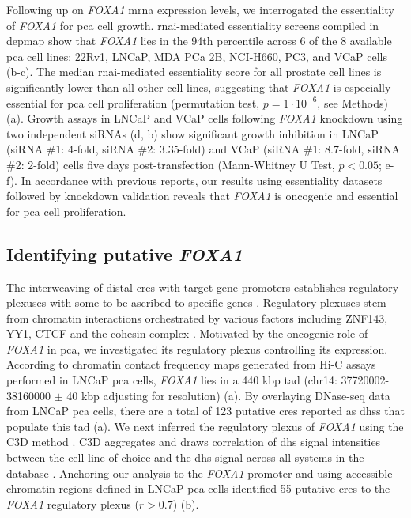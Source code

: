 Following up on \emph{FOXA1} \gls{mrna} expression levels, we interrogated the essentiality of \emph{FOXA1} for \gls{pca} cell growth.
\gls{rnai}-mediated essentiality screens compiled in \gls{depmap} show that \emph{FOXA1} lies in the 94th percentile across 6 of the 8 available \gls{pca} cell lines: 22Rv1, LNCaP, MDA PCa 2B, NCI-H660, PC3, and VCaP cells (b-c).
The median \gls{rnai}-mediated essentiality score for all prostate cell lines is significantly lower than all other cell lines, suggesting that \emph{FOXA1} is especially essential for \gls{pca} cell proliferation (permutation test, $p = 1 \cdot 10^{-6}$, see Methods) (a).
Growth assays in LNCaP and VCaP cells following \emph{FOXA1} knockdown using two independent siRNAs (d, b) show significant growth inhibition in LNCaP (siRNA \#1: 4-fold, siRNA \#2: 3.35-fold) and VCaP (siRNA \#1: 8.7-fold, siRNA \#2: 2-fold) cells five days post-transfection (Mann-Whitney U Test, $p<0.05$; e-f).
In accordance with previous reports, our results using essentiality datasets followed by knockdown validation reveals that \emph{FOXA1} is oncogenic and essential for \gls{pca} cell proliferation.

\subsection{Identifying putative \emph{FOXA1} }

The interweaving of distal \glspl{cre} with target gene promoters establishes regulatory plexuses with some to be ascribed to specific genes \cite{sallariConvergenceDispersedRegulatory2016,baileyNoncodingSomaticInherited2016}.
Regulatory plexuses stem from chromatin interactions orchestrated by various factors including ZNF143, YY1, CTCF and the cohesin complex \cite{phillipsCTCFMasterWeaver2009,weintraubYY1StructuralRegulator2017,baileyZNF143ProvidesSequence2015}.
Motivated by the oncogenic role of \emph{FOXA1} in \gls{pca}, we investigated its regulatory plexus controlling its expression.
According to chromatin contact frequency maps generated from Hi-C assays performed in LNCaP \gls{pca} cells, \emph{FOXA1} lies in a 440 \gls{kbp} \gls{tad} (chr14: 37720002-38160000 $\pm$ 40 \gls{kbp} adjusting for resolution) (a).
By overlaying DNase-seq data from LNCaP \gls{pca} cells, there are a total of 123 putative \glspl{cre} reported as \glspl{dhs} that populate this \gls{tad} (a).
We next inferred the regulatory plexus of \emph{FOXA1} using the C3D method \cite{mehdiC3DToolPredict2019}.
C3D aggregates and draws correlation of \gls{dhs} signal intensities between the cell line of choice and the \gls{dhs} signal across all systems in the database \cite{mehdiC3DToolPredict2019}.
Anchoring our analysis to the \emph{FOXA1} promoter and using accessible chromatin regions defined in LNCaP \gls{pca} cells identified 55 putative \glspl{cre} to the \emph{FOXA1} regulatory plexus ($r > 0.7$) (b).


